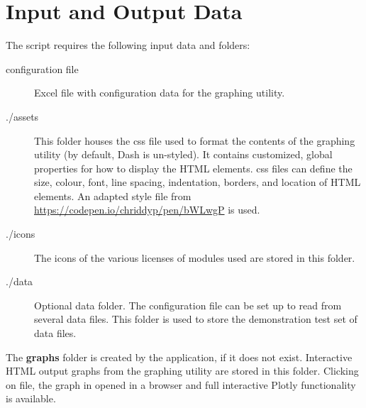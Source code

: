 \chapter{Input and Output Data}
\label{chap:inputoutput}

The script requires the following input data and folders:


\begin{description}
  \item[configuration file] Excel file with configuration data for the graphing utility.
  \item[./assets] This folder houses the \ac{css} file used to format the contents of the graphing utility (by default, Dash is un-styled). It contains customized, global properties for how to display the \ac{HTML} elements. \ac{css} files can define the size, colour, font, line spacing, indentation, borders, and location of \ac{HTML} elements. An adapted style file from \url{https://codepen.io/chriddyp/pen/bWLwgP} is used.
  \item[./icons] The icons of the various licenses of modules used are stored in this folder.
  \item[./data] Optional data folder. The configuration file can be set up to read from several data files. This folder is used to store the demonstration test set of data files.
\end{description}

The \textbf{graphs} folder is created by the application, if it does not exist.
Interactive \ac{HTML} output graphs from the graphing utility are stored in this folder. Clicking on file, the graph in opened in a browser and full interactive Plotly functionality is available.

